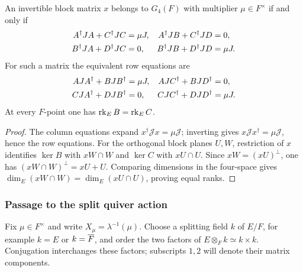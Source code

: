 \begin{proposition}\label{m2:geo:block-equations}
An invertible block matrix $x$ belongs to $G_4(F)$ with multiplier
$\mu\in F^\times$ if and only if
\begin{align}
 A^\dagger JA+C^\dagger JC&=\mu J,&
 A^\dagger JB+C^\dagger JD&=0,\label{m2:geo:column-equations}\\
 B^\dagger JA+D^\dagger JC&=0,&
 B^\dagger JB+D^\dagger JD&=\mu J.\notag
\end{align}
For such a matrix the equivalent row equations are
\begin{align}
 AJA^\dagger+BJB^\dagger&=\mu J,&
 AJC^\dagger+BJD^\dagger&=0,\label{m2:geo:row-equations}\\
 CJA^\dagger+DJB^\dagger&=0,&
 CJC^\dagger+DJD^\dagger&=\mu J.\notag
\end{align}
At every $F$-point one has $\operatorname{rk}_E B=\operatorname{rk}_E C$.
\end{proposition}

\begin{proof}
The column equations expand $x^\dagger\mathcal Jx=\mu\mathcal J$;
inverting gives $x\mathcal Jx^\dagger=\mu\mathcal J$, hence the row
equations. For the orthogonal block planes $U,W$, restriction of $x$
identifies $\ker B$ with $xW\cap W$ and $\ker C$ with $xU\cap U$.
Since $xW=(xU)^\perp$, one has
$(xW\cap W)^\perp=xU+U$. Comparing dimensions in the four-space
gives $\dim_E(xW\cap W)=\dim_E(xU\cap U)$, proving equal ranks.
\end{proof}

\subsubsection{Passage to the split quiver action}

Fix $\mu\in F^\times$ and write $X_\mu=\lambda^{-1}(\mu)$.
Choose a splitting field $k$ of $E/F$, for example $k=E$ or
$k=\overline F$, and order the two factors of
$E\otimes_F k\simeq k\times k$. Conjugation interchanges these
factors; subscripts $1,2$ will denote their matrix components.

